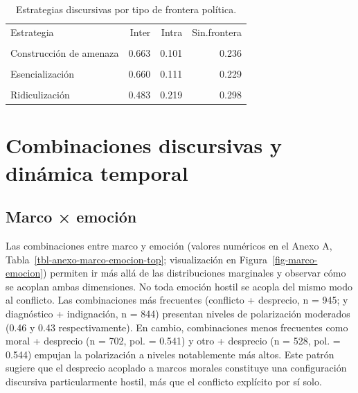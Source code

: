 \documentclass[
  letterpaper,
  numbers=noendperiod,
  fontsize=11pt,
  DIV=12,
  titlepage=false]{scrreprt}
\begin{document}
\begin{longtable}[t]{lrrr}

\caption{\label{tbl-estrategia-frontera}Estrategias discursivas por tipo
de frontera política.}

\tabularnewline

\\
\toprule
Estrategia & Inter & Intra & Sin.frontera\\
\midrule
\cellcolor{gray!10}{Atribución oculta} & \cellcolor{gray!10}{0.548} & \cellcolor{gray!10}{0.175} & \cellcolor{gray!10}{0.277}\\
Construcción de amenaza & 0.663 & 0.101 & 0.236\\
\cellcolor{gray!10}{Deslegitimación} & \cellcolor{gray!10}{0.578} & \cellcolor{gray!10}{0.183} & \cellcolor{gray!10}{0.239}\\
Esencialización & 0.660 & 0.111 & 0.229\\
\cellcolor{gray!10}{Ninguna} & \cellcolor{gray!10}{0.329} & \cellcolor{gray!10}{0.130} & \cellcolor{gray!10}{0.540}\\
\addlinespace
Ridiculización & 0.483 & 0.219 & 0.298\\
\bottomrule

\end{longtable}

\section{Combinaciones discursivas y dinámica
temporal}\label{combinaciones-discursivas-y-dinuxe1mica-temporal}

\subsection{Marco × emoción}\label{marco-emociuxf3n}

Las combinaciones entre marco y emoción (valores numéricos en el Anexo
A, Tabla~\ref{tbl-anexo-marco-emocion-top}; visualización en
Figura~\ref{fig-marco-emocion}) permiten ir más allá de las
distribuciones marginales y observar cómo se acoplan ambas dimensiones.
No toda emoción hostil se acopla del mismo modo al conflicto. Las
combinaciones más frecuentes (conflicto + desprecio, n = 945; y
diagnóstico + indignación, n = 844) presentan niveles de polarización
moderados (0.46 y 0.43 respectivamente). En cambio, combinaciones menos
frecuentes como moral + desprecio (n = 702, pol. = 0.541) y otro +
desprecio (n = 528, pol. = 0.544) empujan la polarización a niveles
notablemente más altos. Este patrón sugiere que el desprecio acoplado a
marcos morales constituye una configuración discursiva particularmente
hostil, más que el conflicto explícito por sí solo.
\end{document}
